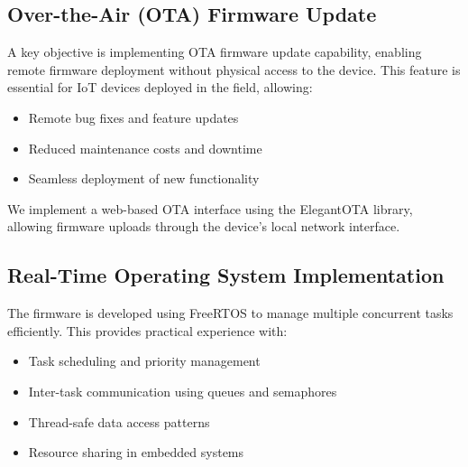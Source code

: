 \subsection*{Over-the-Air (OTA) Firmware Update}

A key objective is implementing OTA firmware update capability, enabling remote firmware deployment without physical access to the device. This feature is essential for IoT devices deployed in the field, allowing:
\begin{itemize}
    \item Remote bug fixes and feature updates
    \item Reduced maintenance costs and downtime
    \item Seamless deployment of new functionality
\end{itemize}

We implement a web-based OTA interface using the ElegantOTA library, allowing firmware uploads through the device's local network interface.

\subsection*{Real-Time Operating System Implementation}

The firmware is developed using FreeRTOS to manage multiple concurrent tasks efficiently. This provides practical experience with:
\begin{itemize}
    \item Task scheduling and priority management
    \item Inter-task communication using queues and semaphores
    \item Thread-safe data access patterns
    \item Resource sharing in embedded systems
\end{itemize}

